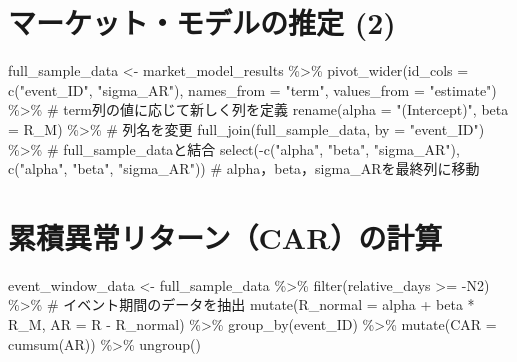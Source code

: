 \documentclass[
  letterpaper,
  DIV=11,
  numbers=noendperiod]{scrreprt}
\newenvironment{Shaded}{\begin{snugshade}}{\end{snugshade}}
\newcommand{\AttributeTok}[1]{\textcolor[rgb]{0.40,0.45,0.13}{#1}}
\newcommand{\CommentTok}[1]{\textcolor[rgb]{0.37,0.37,0.37}{#1}}
\newcommand{\FunctionTok}[1]{\textcolor[rgb]{0.28,0.35,0.67}{#1}}
\newcommand{\NormalTok}[1]{\textcolor[rgb]{0.00,0.23,0.31}{#1}}
\newcommand{\OtherTok}[1]{\textcolor[rgb]{0.00,0.23,0.31}{#1}}
\newcommand{\SpecialCharTok}[1]{\textcolor[rgb]{0.37,0.37,0.37}{#1}}
\newcommand{\StringTok}[1]{\textcolor[rgb]{0.13,0.47,0.30}{#1}}
\begin{document}
\section{マーケット・モデルの推定
(2)}\label{ux30deux30fcux30b1ux30c3ux30c8ux30e2ux30c7ux30ebux306eux63a8ux5b9a-2}

\begin{Shaded}
\begin{Highlighting}[]
\NormalTok{full\_sample\_data }\OtherTok{\textless{}{-}}\NormalTok{ market\_model\_results }\SpecialCharTok{\%\textgreater{}\%} 
  \FunctionTok{pivot\_wider}\NormalTok{(}\AttributeTok{id\_cols =} \FunctionTok{c}\NormalTok{(}\StringTok{"event\_ID"}\NormalTok{, }\StringTok{"sigma\_AR"}\NormalTok{), }\AttributeTok{names\_from =} \StringTok{"term"}\NormalTok{, }\AttributeTok{values\_from =} \StringTok{"estimate"}\NormalTok{) }\SpecialCharTok{\%\textgreater{}\%} \CommentTok{\# term列の値に応じて新しく列を定義}
  \FunctionTok{rename}\NormalTok{(}\AttributeTok{alpha =} \StringTok{"(Intercept)"}\NormalTok{, }\AttributeTok{beta =}\NormalTok{ R\_M) }\SpecialCharTok{\%\textgreater{}\%} \CommentTok{\# 列名を変更}
  \FunctionTok{full\_join}\NormalTok{(full\_sample\_data, }\AttributeTok{by =} \StringTok{"event\_ID"}\NormalTok{) }\SpecialCharTok{\%\textgreater{}\%} \CommentTok{\# full\_sample\_dataと結合}
  \FunctionTok{select}\NormalTok{(}\SpecialCharTok{{-}}\FunctionTok{c}\NormalTok{(}\StringTok{"alpha"}\NormalTok{, }\StringTok{"beta"}\NormalTok{, }\StringTok{"sigma\_AR"}\NormalTok{), }\FunctionTok{c}\NormalTok{(}\StringTok{"alpha"}\NormalTok{, }\StringTok{"beta"}\NormalTok{, }\StringTok{"sigma\_AR"}\NormalTok{)) }\CommentTok{\# alpha，beta，sigma\_ARを最終列に移動}
\end{Highlighting}
\end{Shaded}

\section{累積異常リターン（CAR）の計算}\label{ux7d2fux7a4dux7570ux5e38ux30eaux30bfux30fcux30f3carux306eux8a08ux7b97}

\begin{Shaded}
\begin{Highlighting}[]
\NormalTok{event\_window\_data }\OtherTok{\textless{}{-}}\NormalTok{ full\_sample\_data }\SpecialCharTok{\%\textgreater{}\%} 
  \FunctionTok{filter}\NormalTok{(relative\_days }\SpecialCharTok{\textgreater{}=} \SpecialCharTok{{-}}\NormalTok{N2) }\SpecialCharTok{\%\textgreater{}\%} \CommentTok{\# イベント期間のデータを抽出}
  \FunctionTok{mutate}\NormalTok{(}\AttributeTok{R\_normal =}\NormalTok{ alpha }\SpecialCharTok{+}\NormalTok{ beta }\SpecialCharTok{*}\NormalTok{ R\_M,}
         \AttributeTok{AR =}\NormalTok{ R }\SpecialCharTok{{-}}\NormalTok{ R\_normal) }\SpecialCharTok{\%\textgreater{}\%}
  \FunctionTok{group\_by}\NormalTok{(event\_ID) }\SpecialCharTok{\%\textgreater{}\%} 
  \FunctionTok{mutate}\NormalTok{(}\AttributeTok{CAR =} \FunctionTok{cumsum}\NormalTok{(AR)) }\SpecialCharTok{\%\textgreater{}\%}
  \FunctionTok{ungroup}\NormalTok{() }
\end{Highlighting}
\end{Shaded}
\end{document}
